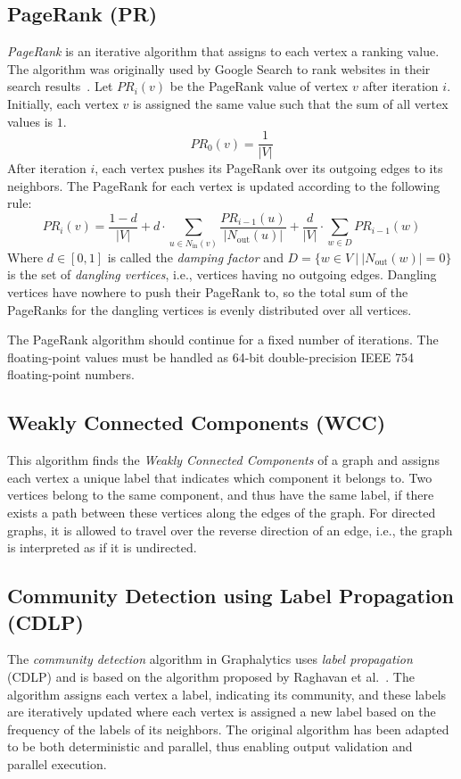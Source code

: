 \subsection{PageRank (PR)}
\emph{PageRank} is an iterative algorithm that assigns to each vertex a ranking value. The algorithm was originally used by Google Search to rank websites in their search results~\cite{page1999pagerank}. Let $\textit{PR}_i(v)$ be the PageRank value of vertex $v$ after iteration $i$. Initially, each vertex $v$ is assigned the same value such that the sum of all vertex values is $1$.
%
\begin{equation}
\textit{PR}_0(v) = \frac{1}{|V|}
\end{equation}
%
After iteration $i$, each vertex pushes its PageRank over its outgoing edges to its neighbors. The PageRank for each vertex is updated according to the following rule:
%
\begin{equation}
\textit{PR}_i(v) = \frac{1-d}{|V|} + d \cdot \sum_{u \in N_\mathrm{in}(v)} \frac{\textit{PR}_{i - 1}(u)}{|N_\mathrm{out}(u)|} + \frac{d}{|V|} \cdot \sum_{w \in D} \textit{PR}_{i - 1}(w)
\end{equation}
%
Where $d \in [0,1]$ is called the \emph{damping factor} and $D = \big\{w \in V \ \big| \ |N_\mathrm{out}(w)| = 0 \big\}$ is the set of \emph{dangling vertices}, i.e., vertices having no outgoing edges. Dangling vertices have nowhere to push their PageRank to, so the total sum of the PageRanks for the dangling vertices is evenly distributed over all vertices. 

The PageRank algorithm should continue for a fixed number of iterations. The floating-point values must be handled as 64-bit double-precision IEEE 754 floating-point numbers. 


\subsection{Weakly Connected Components (WCC)}
This algorithm finds the \emph{Weakly Connected Components} of a graph and assigns each vertex a unique label that indicates which component it belongs to. Two vertices belong to the same component, and thus have the same label, if there exists a path between these vertices along the edges of the graph. For directed graphs, it is allowed to travel over the reverse direction of an edge, i.e., the graph is interpreted as if it is undirected.


\subsection{Community Detection using Label Propagation (CDLP)}
The \emph{community detection} algorithm in Graphalytics uses \emph{label propagation} (CDLP) and is based on the algorithm proposed by Raghavan et al.~\cite{raghavan2007near}. The algorithm assigns each vertex a label, indicating its community, and these labels are iteratively updated where each vertex is assigned a new label based on the frequency of the labels of its neighbors. The original algorithm has been adapted to be both deterministic and parallel, thus enabling output validation and parallel execution.

